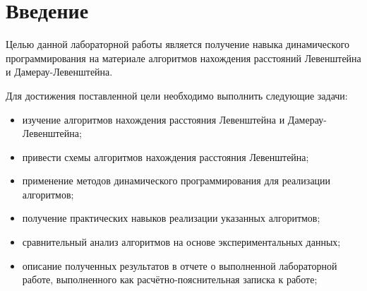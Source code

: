 \chapter*{Введение}

Целью данной лабораторной работы является получение навыка динамического программирования на материале алгоритмов нахождения расстояний Левенштейна и Дамерау-Левенштейна.

Для достижения поставленной цели необходимо выполнить следующие
задачи:
\begin{itemize}
	\item изучение алгоритмов нахождения расстояния Левенштейна и Дамерау-Левенштейна;
	\item привести схемы алгоритмов нахождения расстояния Левенштейна;
	\item применение методов динамического программирования для реализации алгоритмов;
	\item получение практических навыков реализации указанных алгоритмов;
	\item сравнительный анализ алгоритмов на основе экспериментальных данных;
	\item описание полученных результатов в отчете о выполненной лабораторной работе, выполненного как расчётно-пояснительная записка к работе;
\end{itemize}
